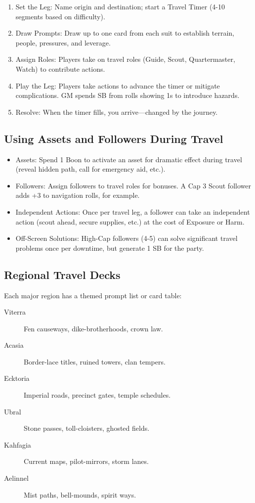 \documentclass[11pt,twoside,openany]{book}
\begin{document}
\begin{enumerate}
\item Set the Leg: Name origin and destination; start a Travel Timer (4-10 segments based on difficulty).
\item Draw Prompts: Draw up to one card from each suit to establish terrain, people, pressures, and leverage.
\item Assign Roles: Players take on travel roles (Guide, Scout, Quartermaster, Watch) to contribute actions.
\item Play the Leg: Players take actions to advance the timer or mitigate complications. GM spends SB from rolls showing 1s to introduce hazards.
\item Resolve: When the timer fills, you arrive---changed by the journey.
\end{enumerate}

\subsection*{Using Assets and Followers During Travel}

\begin{itemize}
\item Assets: Spend 1 Boon to activate an asset for dramatic effect during travel (reveal hidden path, call for emergency aid, etc.).
\item Followers: Assign followers to travel roles for bonuses. A Cap 3 Scout follower adds +3 to navigation rolls, for example.
\item Independent Actions: Once per travel leg, a follower can take an independent action (scout ahead, secure supplies, etc.) at the cost of Exposure or Harm.
\item Off-Screen Solutions: High-Cap followers (4-5) can solve significant travel problems once per downtime, but generate 1 SB for the party.
\end{itemize}

\subsection*{Regional Travel Decks}

Each major region has a themed prompt list or card table:
\begin{description}
\item[Viterra] Fen causeways, dike-brotherhoods, crown law.
\item[Acasia] Border-lace titles, ruined towers, clan tempers.
\item[Ecktoria] Imperial roads, precinct gates, temple schedules.
\item[Ubral] Stone passes, toll-cloisters, ghosted fields.
\item[Kahfagia] Current maps, pilot-mirrors, storm lanes.
\item[Aelinnel] Mist paths, bell-mounds, spirit ways.
\end{description}
\end{document}
